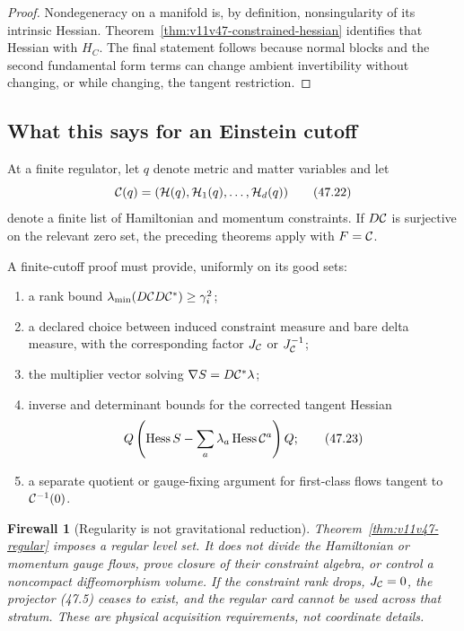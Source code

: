 \documentclass[11pt]{article}
\newtheorem{firewall}[theorem]{Firewall}
\begin{document}
\begin{proof}
Nondegeneracy on a manifold is, by definition, nonsingularity of its
intrinsic Hessian.  Theorem~\ref{thm:v11v47-constrained-hessian}
identifies that Hessian with \(H_C\).  The final statement follows
because normal blocks and the second fundamental form terms can change
ambient invertibility without changing, or while changing, the
tangent restriction.
\end{proof}

\subsection{What this says for an Einstein cutoff}

At a finite regulator, let \(q\) denote metric and matter variables and
let
\[
             {\cal C}(q)=({\cal H}(q),{\cal H}_1(q),
                    \ldots,{\cal H}_d(q))                     \tag{47.22}
\]
denote a finite list of Hamiltonian and momentum constraints.  If
\(D{\cal C}\) is surjective on the relevant zero set, the preceding
theorems apply with \(F={\cal C}\).

\begin{ledger}
\label{led:v11v47-einstein}
A finite-cutoff proof must provide, uniformly on its good sets:
\begin{enumerate}
\item a rank bound
\(\lambda_{\min}(D{\cal C}D{\cal C}^*)\ge\gamma_i^2\);
\item a declared choice between induced constraint measure and bare
delta measure, with the corresponding factor \(J_{\cal C}\) or
\(J_{\cal C}^{-1}\);
\item the multiplier vector solving
\(\nabla S=D{\cal C}^*\lambda\);
\item inverse and determinant bounds for the corrected tangent Hessian
\[
 Q\left(\operatorname{Hess}S
       -\sum_a\lambda_a\operatorname{Hess}{\cal C}^a\right)Q;
                                                                  \tag{47.23}
\]
\item a separate quotient or gauge-fixing argument for first-class
flows tangent to \({\cal C}^{-1}(0)\).
\end{enumerate}
\end{ledger}

\begin{firewall}[Regularity is not gravitational reduction]
\label{fire:v11v47-first-class}
Theorem~\ref{thm:v11v47-regular} imposes a regular level set.  It does
not divide the Hamiltonian or momentum gauge flows, prove closure of
their constraint algebra, or control a noncompact diffeomorphism
volume.  If the constraint rank drops, \(J_{\cal C}=0\), the projector
(47.5) ceases to exist, and the regular card cannot be used across
that stratum.  These are physical acquisition requirements, not
coordinate details.
\end{firewall}
\end{document}
